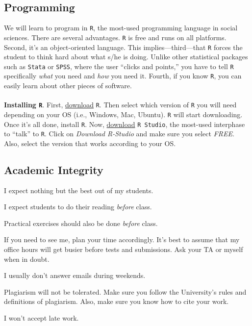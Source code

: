 \documentclass[letterpaper]{article}
\renewenvironment{itemize}{
  \begin{list}{}{
    \setlength{\leftmargin}{1.5em}
  }
}{
  \end{list}
}
\begin{document}
\subsection*{Programming}

We will learn to program in \texttt{R}, the most-used programming language in social sciences. There are several advantages. \texttt{R} is free and runs on all platforms. Second, it's an object-oriented language. This implies---third---that \texttt{R} forces the student to think hard about what s/he is doing. Unlike other statistical packages such as \texttt{Stata} or \texttt{SPSS}, where the user ``clicks and points,'' you have to tell \texttt{R} specifically \emph{what} you need and \emph{how} you need it. Fourth, if you know \texttt{R}, you can easily learn about other pieces of software.
\\
\\
{\bf Installing \texttt{R}}. First, \href{https://cloud.r-project.org}{download} \texttt{R}. Then select which version of \texttt{R} you will need depending on your OS (i.e., Windows, Mac, Ubuntu). \texttt{R} will start downloading. Once it's all done, install \texttt{R}. Now, \href{https://www.rstudio.com}{download} \texttt{R Studio}, the most-used interphase to ``talk'' to \texttt{R}. Click on \emph{Download R-Studio} and make sure you select \emph{FREE}. Also, select the version that works according to your OS.


\subsection*{Academic Integrity}

I expect nothing but the best out of my students. 

\begin{itemize}
     \item[$\circ$] I expect students to do their reading \emph{before} class.
     \item[$\circ$] Practical exercises should also be done \emph{before} class. 
     \item[$\circ$] If you need to see me, plan your time accordingly. It's best to assume that my office hours will get busier before tests and submissions. Ask your TA or myself when in doubt. 

  \item[$\circ$] I usually don't answer emails during weekends. 
\end{itemize}


\begin{itemize}
  \item[{\color{red}\Pointinghand}] Plagiarism will not be tolerated. Make sure you follow the University's rules and definitions of plagiarism. Also, make sure you know how to cite your work. 

  \item[{\color{red}\Pointinghand}] I won't accept late work.

\end{itemize}
\end{document}
